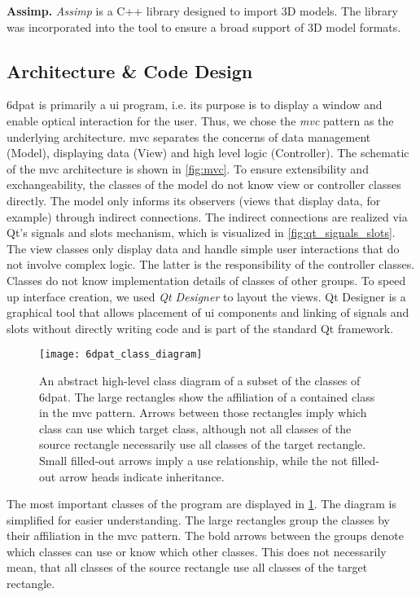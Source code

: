 \noindent\textbf{Assimp.} \textit{Assimp} \cite{assimp} is a C++ library designed to import 3D models. The library was incorporated into the tool to ensure a broad support of 3D model formats.

\subsection{Architecture \& Code Design}

\ac{6dpat} is primarily a \ac{ui} program, i.e. its purpose is to display a window and enable optical interaction for the user. Thus, we chose the \textit{\ac{mvc}} pattern as the underlying architecture. \ac{mvc} separates the concerns of data management (Model), displaying data (View) and high level logic (Controller). The schematic of the \ac{mvc} architecture is shown in \fig \ref{fig:mvc}. To ensure extensibility and exchangeability, the classes of the model do not know view or controller classes directly. The model only informs its observers (views that display data, for example) through indirect connections. The indirect connections are realized via Qt's signals and slots mechanism, which is visualized in \fig \ref{fig:qt_signals_slots}. The view classes only display data and handle simple user interactions that do not involve complex logic. The latter is the responsibility of the controller classes. Classes do not know implementation details of classes of other groups. To speed up interface creation, we used \textit{Qt Designer} to layout the views. Qt Designer is a graphical tool that allows placement of \ac{ui} components and linking of signals and slots without directly writing code and is part of the standard Qt framework.

\begin{figure}[!tbp]
       \centering
   \texttt{[image: 6dpat\_class\_diagram]}
    \caption{An abstract high-level class diagram of a subset of the classes of \ac{6dpat}. The large rectangles show the affiliation of a contained class in the \ac{mvc} pattern. Arrows between those rectangles imply which class can use which target class, although not all classes of the source rectangle necessarily use all classes of the target rectangle. Small filled-out arrows imply a use relationship, while the not filled-out arrow heads indicate inheritance.}
   \label{fig:6dpat_class_diagram}
\end{figure}

The most important classes of the program are displayed in \fig \ref{fig:6dpat_class_diagram}. The diagram is simplified for easier understanding. The large rectangles group the classes by their affiliation in the \ac{mvc} pattern. The bold arrows between the groups denote which classes can use or know which other classes. This does not necessarily mean, that all classes of the source rectangle use all classes of the target rectangle. 


